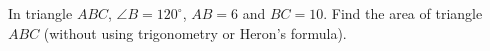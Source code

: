 In triangle $ABC$, $\angle B=120^\circ$, $AB=6$ and $BC=10$. Find the area of triangle $ABC$ (without using trigonometry or Heron's formula).
